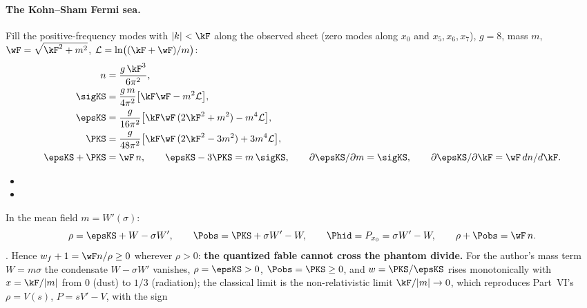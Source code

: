 \paragraph{The Kohn--Sham Fermi sea.} Fill the positive-frequency modes with $|k|<\kF$ along the
observed sheet (zero modes along $x_0$ and $x_5,x_6,x_7$), $g=8$, mass $m$, $\wF=\sqrt{\kF^2+m^2}$,
$\mathcal L=\ln\bigl((\kF+\wF)/m\bigr)$:
\begin{align*}
  n&=\frac{g\,\kF^3}{6\pi^2},\\
  \sigKS&=\frac{g\,m}{4\pi^2}\bigl[\kF\wF-m^2\mathcal L\bigr],\\
  \epsKS&=\frac{g}{16\pi^2}\bigl[\kF\wF\,(2\kF^2+m^2)-m^4\mathcal L\bigr],\\
  \PKS&=\frac{g}{48\pi^2}\bigl[\kF\wF\,(2\kF^2-3m^2)+3m^4\mathcal L\bigr],\\
  \epsKS+\PKS&=\wF\,n,\qquad \epsKS-3\PKS=m\,\sigKS,\qquad \partial\epsKS/\partial m=\sigKS,\qquad
  \partial\epsKS/\partial\kF=\wF\,dn/d\kF .
\end{align*}
\begin{itemize}
  \item {}
  \item {}
\end{itemize}
In the mean field $m=W'(\sigma)$:
\[
  \rho=\epsKS+W-\sigma W',\qquad \Pobs=\PKS+\sigma W'-W,\qquad \Phid=P_{x_0}=\sigma W'-W,\qquad \rho+\Pobs=\wF\,n .
\]
 . Hence $w_f+1=\wF n/\rho\geq0$ wherever $\rho>0$:
\textbf{the quantized fable cannot cross the phantom divide.} For the author's mass term $W=m\sigma$ the
condensate $W-\sigma W'$ vanishes, $\rho=\epsKS>0$, $\Pobs=\PKS\geq0$, and $w=\PKS/\epsKS$ rises
monotonically with $x=\kF/|m|$ from 0 (dust) to $1/3$ (radiation); the classical limit is the
non-relativistic limit $\kF/|m|\to0$, which reproduces Part~VI's $\rho=V(s)$, $P=sV'-V$, with the sign
